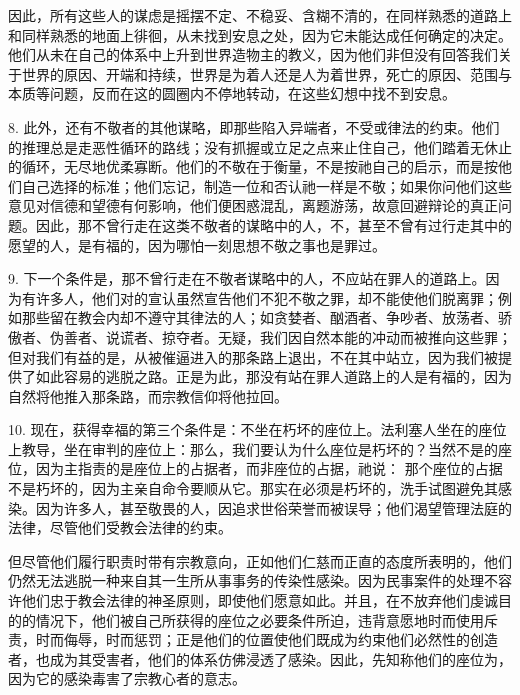 因此，所有这些人的谋虑是摇摆不定、不稳妥、含糊不清的，在同样熟悉的道路上和同样熟悉的地面上徘徊，从未找到安息之处，因为它未能达成任何确定的决定。他们从未在自己的体系中上升到世界造物主的教义，因为他们非但没有回答我们关于世界的原因、开端和持续，世界是为着人还是人为着世界，死亡的原因、范围与本质等问题，反而在这的圆圈内不停地转动，在这些幻想中找不到安息。\par

8. 此外，还有不敬者的其他谋略，即那些陷入异端者，不受或律法的约束。他们的推理总是走恶性循环的路线；没有抓握或立足之点来止住自己，他们踏着无休止的循环，无尽地优柔寡断。他们的不敬在于衡量，不是按祂自己的启示，而是按他们自己选择的标准；他们忘记，制造一位和否认祂一样是不敬；如果你问他们这些意见对信德和望德有何影响，他们便困惑混乱，离题游荡，故意回避辩论的真正问题。因此，那不曾行走在这类不敬者的谋略中的人，不，甚至不曾有过行走其中的愿望的人，是有福的，因为哪怕一刻思想不敬之事也是罪过。\par

9. 下一个条件是，那不曾行走在不敬者谋略中的人，不应站在罪人的道路上。因为有许多人，他们对的宣认虽然宣告他们不犯不敬之罪，却不能使他们脱离罪；例如那些留在教会内却不遵守其律法的人；如贪婪者、酗酒者、争吵者、放荡者、骄傲者、伪善者、说谎者、掠夺者。无疑，我们因自然本能的冲动而被推向这些罪；但对我们有益的是，从被催逼进入的那条路上退出，不在其中站立，因为我们被提供了如此容易的逃脱之路。正是为此，那没有站在罪人道路上的人是有福的，因为自然将他推入那条路，而宗教信仰将他拉回。\par

10. 现在，获得幸福的第三个条件是：不坐在朽坏的座位上。法利塞人坐在的座位上教导，坐在审判的座位上：那么，我们要认为什么座位是朽坏的？当然不是的座位，因为主指责的是座位上的占据者，而非座位的占据，祂说： 那个座位的占据不是朽坏的，因为主亲自命令要顺从它。那实在必须是朽坏的，洗手试图避免其感染。因为许多人，甚至敬畏的人，因追求世俗荣誉而被误导；他们渴望管理法庭的法律，尽管他们受教会法律的约束。\par

但尽管他们履行职责时带有宗教意向，正如他们仁慈而正直的态度所表明的，他们仍然无法逃脱一种来自其一生所从事事务的传染性感染。因为民事案件的处理不容许他们忠于教会法律的神圣原则，即使他们愿意如此。并且，在不放弃他们虔诚目的的情况下，他们被自己所获得的座位之必要条件所迫，违背意愿地时而使用斥责，时而侮辱，时而惩罚；正是他们的位置使他们既成为约束他们必然性的创造者，也成为其受害者，他们的体系仿佛浸透了感染。因此，先知称他们的座位为，因为它的感染毒害了宗教心者的意志。\par

